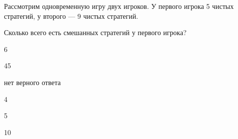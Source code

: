 
\begin{question}
Рассмотрим одновременную игру двух игроков.
У первого игрока 5 чистых стратегий, у второго --- 9 чистых стратегий.

Сколько всего есть смешанных стратегий у первого игрока?
\begin{answerlist}
  \item 6
  \item 45
  \item нет верного ответа
  \item 4
  \item 5
  \item 10
\end{answerlist}
\end{question}


